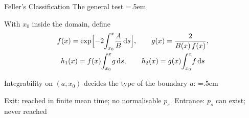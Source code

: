 \documentclass[xcolor={dvipsnames},t]{beamer}
\let\olditemize=\itemize
\let\endolditemize=\enditemize
\renewenvironment{itemize}{\olditemize \itemsep=.5em }{\endolditemize}
\begin{document}
\begin{frame}{Feller's Classification}
    \alert{The general test}
    \begin{itemize}
        \item<2-> With $x_0$ inside the domain, define
        \begin{gather*}
            f(x)=\exp\Bigl[-2\!\int_{x_0}^x\!\frac{A}{B}\,\dd s\Bigr],\qquad g(x)=\frac{2}{B(x)\,f(x)}, \\
            h_1(x)=f(x)\!\int_{x_0}^x\!g\,\dd s,\qquad h_2(x)=g(x)\!\int_{x_0}^x\!f\,\dd s
        \end{gather*}
        \vspace{-1.5em}
        \item<3-> Integrability on $(a,x_0)$ decides the type of the boundary $a$:
    \end{itemize}
    \begin{itemize}
        \item<4-> Exit: reached in finite mean time; no normalisable $p_s$. Entrance: $p_s$ can exist; never reached
    \end{itemize}
\end{frame}
\end{document}

